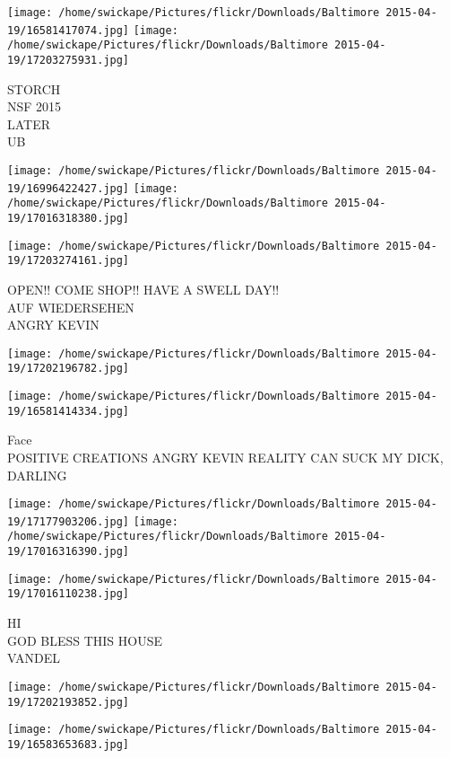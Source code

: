 \documentclass[10pt,letterpaper]{article}
\begin{document}
\texttt{[image: /home/swickape/Pictures/flickr/Downloads/Baltimore 2015-04-19/16581417074.jpg]}
\texttt{[image: /home/swickape/Pictures/flickr/Downloads/Baltimore 2015-04-19/17203275931.jpg]}

STORCH\\
NSF 2015\\
LATER\\
UB\\
\pagebreak

\texttt{[image: /home/swickape/Pictures/flickr/Downloads/Baltimore 2015-04-19/16996422427.jpg]}
\texttt{[image: /home/swickape/Pictures/flickr/Downloads/Baltimore 2015-04-19/17016318380.jpg]}

\texttt{[image: /home/swickape/Pictures/flickr/Downloads/Baltimore 2015-04-19/17203274161.jpg]}

OPEN!! COME SHOP!! HAVE A SWELL DAY!!\\
AUF WIEDERSEHEN\\
ANGRY KEVIN\\
\pagebreak

\texttt{[image: /home/swickape/Pictures/flickr/Downloads/Baltimore 2015-04-19/17202196782.jpg]}

\vspace{0.25in}
\texttt{[image: /home/swickape/Pictures/flickr/Downloads/Baltimore 2015-04-19/16581414334.jpg]}

Face\\
POSITIVE CREATIONS ANGRY KEVIN REALITY CAN SUCK MY DICK, DARLING\\
\pagebreak

\texttt{[image: /home/swickape/Pictures/flickr/Downloads/Baltimore 2015-04-19/17177903206.jpg]}
\texttt{[image: /home/swickape/Pictures/flickr/Downloads/Baltimore 2015-04-19/17016316390.jpg]}

\texttt{[image: /home/swickape/Pictures/flickr/Downloads/Baltimore 2015-04-19/17016110238.jpg]}

HI\\
GOD BLESS THIS HOUSE\\
VANDEL\\
\pagebreak

\texttt{[image: /home/swickape/Pictures/flickr/Downloads/Baltimore 2015-04-19/17202193852.jpg]}

\vspace{0.25in}
\texttt{[image: /home/swickape/Pictures/flickr/Downloads/Baltimore 2015-04-19/16583653683.jpg]}
\end{document}
